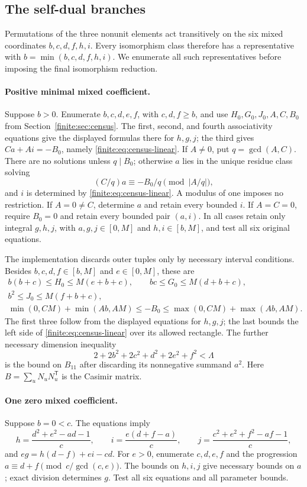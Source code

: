 \subsection{The self-dual branches}
Permutations of the three nonunit elements act transitively on the six
mixed coordinates $b,c,d,f,h,i$. Every isomorphism class therefore
has a representative with $b=\min(b,c,d,f,h,i)$. We enumerate all
such representatives before imposing the final isomorphism reduction.

\paragraph{Positive minimal mixed coefficient.}
Suppose $b>0$. Enumerate $b,c,d,e,f$, with $c,d,f\geq b$,
and use $H_0,G_0,J_0,A,C,B_0$ from Section~\ref{finite:sec:census}.
The first, second, and fourth associativity equations give the displayed
formulas there for $h,g,j$; the third gives
$Ca+Ai=-B_0$, namely \eqref{finite:eq:census-linear}.
If $A\ne0$, put $q=\gcd(A,C)$. There are no solutions unless
$q\mid B_0$; otherwise $a$ lies in the unique residue class solving
\[
 (C/q)a\equiv-B_0/q\pmod{|A/q|},
\]
and $i$ is determined by \eqref{finite:eq:census-linear}. A modulus of one
imposes no restriction. If $A=0\ne C$, determine $a$ and
retain every bounded $i$. If $A=C=0$, require $B_0=0$ and
retain every bounded pair $(a,i)$. In all cases retain only integral
$g,h,j$, with $a,g,j\in[0,M]$ and $h,i\in[b,M]$, and test all
six original equations.

The implementation discards outer tuples only by necessary interval
conditions. Besides $b,c,d,f\in[b,M]$ and $e\in[0,M]$, these are
\begin{gather*}
 b(b+c)\leq H_0\leq M(e+b+c),\qquad
 bc\leq G_0\leq M(d+b+c),\\
 b^2\leq J_0\leq M(f+b+c),\\
 \min(0,CM)+\min(Ab,AM)\leq-B_0
 \leq\max(0,CM)+\max(Ab,AM).
\end{gather*}
The first three follow from the displayed equations for $h,g,j$;
the last bounds the left side of \eqref{finite:eq:census-linear} over its
allowed rectangle. The further necessary dimension inequality
\[
 2+2b^2+2c^2+d^2+2e^2+f^2<\Lambda
\]
is the bound on $B_{11}$ after discarding its nonnegative summand $a^2$.
Here $B=\sum_u N_uN_u^{\mathsf T}$ is the Casimir matrix.

\paragraph{One zero mixed coefficient.}
Suppose $b=0<c$. The equations imply
\[
 h=\frac{d^2+e^2-ad-1}{c},\qquad
 i=\frac{e(d+f-a)}{c},\qquad
 j=\frac{c^2+e^2+f^2-af-1}{c},
\]
and $eg=h(d-f)+ei-cd$.
For $e>0$, enumerate $c,d,e,f$ and the progression
$a\equiv d+f\pmod{c/\gcd(c,e)}$. The bounds on $h,i,j$ give
necessary bounds on $a$; exact division determines $g$. Test all
six equations and all parameter bounds.

